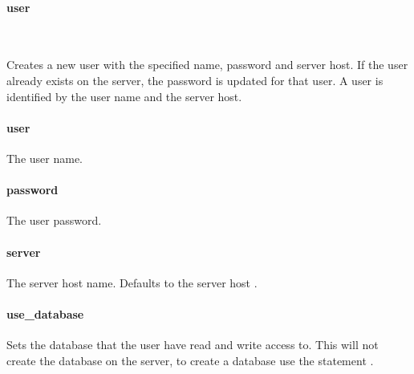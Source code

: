 \paragraph{user}

\\

Creates a new user with the specified name, password and server host.
If the user already exists on the server, the password is updated for that user.
A user is identified by the user name and the server host.

\paragraph{user}


The user name.

\paragraph{password}


The user password.

\paragraph{server}


The server host name. Defaults to the server host .

\paragraph{use\_database}


Sets the database that the user have read and write access to. This will not create
the database on the server, to create a database use the statement .

